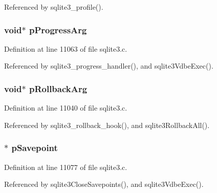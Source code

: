 Referenced by sqlite3\+\_\+profile().

\hypertarget{structsqlite3_aa4d1a13ffa7a0f22477b34a61814eaa3}{}
\subsubsection[{p\+Progress\+Arg}]{\setlength{\rightskip}{0pt plus 5cm}void$\ast$ p\+Progress\+Arg}\label{structsqlite3_aa4d1a13ffa7a0f22477b34a61814eaa3}


Definition at line 11063 of file sqlite3.\+c.



Referenced by sqlite3\+\_\+progress\+\_\+handler(), and sqlite3\+Vdbe\+Exec().

\hypertarget{structsqlite3_a5c723cc74a5267fccd48787c75570897}{}
\subsubsection[{p\+Rollback\+Arg}]{\setlength{\rightskip}{0pt plus 5cm}void$\ast$ p\+Rollback\+Arg}\label{structsqlite3_a5c723cc74a5267fccd48787c75570897}


Definition at line 11040 of file sqlite3.\+c.



Referenced by sqlite3\+\_\+rollback\+\_\+hook(), and sqlite3\+Rollback\+All().

\hypertarget{structsqlite3_a11957df975da6cdbc84a887db41efa92}{}
\subsubsection[{p\+Savepoint}]{$\ast$ p\+Savepoint}\label{structsqlite3_a11957df975da6cdbc84a887db41efa92}


Definition at line 11077 of file sqlite3.\+c.



Referenced by sqlite3\+Close\+Savepoints(), and sqlite3\+Vdbe\+Exec().

\hypertarget{structsqlite3_aba68a77cf29ce08cacb16f81a5e4211b}{}
